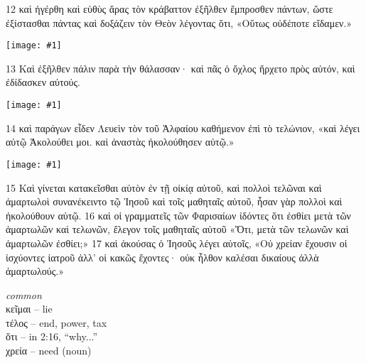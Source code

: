 \documentclass[10pt,a5paper,twoside,twocolumn]{book}
\newcommand{\fig}[1]{\texttt{[image: \#1]}\label{fig:#1}}
\newcommand*\cleartoleftpage{%
  \ifodd\value{page}\hbox{}\clearpage\fi
}
\newenvironment{facing}{\cleartoleftpage}{\clearpage\pagebreak}
\newenvironment{help}{\clearpage}{}
\newenvironment{helpsec}{\begin{minipage}[t]{\textwidth}\begin{multicols}{2}}{\end{multicols}\end{minipage}}
\newenvironment{vocab}{\begin{helpsec}}{\end{helpsec}}
\begin{document}
\begin{facing}
 12 καὶ ἠγέρθη καὶ εὐθὺς ἄρας τὸν κράβαττον ἐξῆλθεν ἔμπροσθεν πάντων, ὥστε ἐξίστασθαι πάντας καὶ δοξάζειν τὸν Θεὸν λέγοντας ὅτι,
«Οὕτως οὐδέποτε εἴδαμεν.»

\fig{02-13} %

	13 Καὶ ἐξῆλθεν πάλιν παρὰ τὴν θάλασσαν· καὶ πᾶς ὁ ὄχλος ἤρχετο πρὸς αὐτόν, καὶ ἐδίδασκεν αὐτούς. 

\fig{02-14} %

14 καὶ παράγων εἶδεν Λευεὶν τὸν τοῦ Ἀλφαίου καθήμενον ἐπὶ \pagebreak
τὸ τελώνιον, «καὶ λέγει αὐτῷ Ἀκολούθει μοι. καὶ ἀναστὰς ἠκολούθησεν αὐτῷ.»

\fig{02-15} %


15 Καὶ γίνεται κατακεῖσθαι αὐτὸν ἐν τῇ οἰκίᾳ αὐτοῦ, καὶ πολλοὶ τελῶναι καὶ ἁμαρτωλοὶ συνανέκειντο τῷ Ἰησοῦ καὶ τοῖς μαθηταῖς αὐτοῦ, ἦσαν γὰρ πολλοὶ καὶ ἠκολούθουν αὐτῷ. 16 καὶ οἱ γραμματεῖς τῶν Φαρισαίων ἰδόντες ὅτι ἐσθίει μετὰ τῶν ἁμαρτωλῶν καὶ τελωνῶν, ἔλεγον τοῖς μαθηταῖς αὐτοῦ 
«Ὅτι, μετὰ τῶν τελωνῶν καὶ ἁμαρτωλῶν ἐσθίει;»
 17 καὶ ἀκούσας ὁ Ἰησοῦς λέγει αὐτοῖς, «Οὐ χρείαν ἔχουσιν οἱ ἰσχύοντες ἰατροῦ ἀλλ’ οἱ κακῶς ἔχοντες· οὐκ ἦλθον καλέσαι δικαίους ἀλλὰ ἁμαρτωλούς.»


\begin{help}
\begin{vocab}
\emph{common}\\
κεῖμαι -- lie\\
τέλος -- end, power, tax\\
ὅτι -- in 2:16, ``why...''\\
χρεία -- need (noun)

\pagebreak


\end{vocab}
\end{help}
\end{facing}
\end{document}
